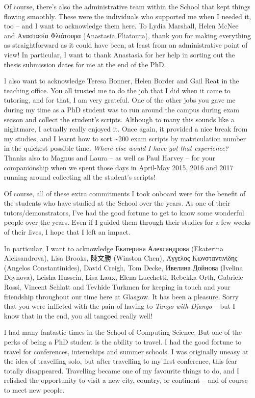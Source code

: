 \begin{preamble}
Of course, there's also the administrative team within the School that kept things flowing smoothly. These were the individuals who supported me when I needed it, too -- and I want to acknowledge them here. To Lydia Marshall, Helen McNee and Αναστασία Φλιάτουρα (Anastasia Fliatoura), thank you for making everything as straightforward as it could have been, at least from an administrative point of view! In particular, I want to thank Anastasia for her help in sorting out the thesis submission dates for me at the end of the PhD.

I also want to acknowledge Teresa Bonner, Helen Border and Gail Reat in the teaching office. You all trusted me to do the job that I did when it came to tutoring, and for that, I am very grateful. One of the other jobs you gave me during my time as a PhD student was to run around the campus during exam season and collect the student's scripts. Although to many this sounds like a nightmare, I actually really enjoyed it. Once again, it provided a nice break from my studies, and I learnt how to sort \textasciitilde 200 exam scripts by matriculation number in the quickest possible time. \emph{Where else would I have got that experience?} Thanks also to Magnus and Laura -- as well as Paul Harvey -- for your companionship when we spent those days in April-May 2015, 2016 and 2017 running around collecting all the student's scripts!

Of course, all of these extra commitments I took onboard were for the benefit of the students who have studied at the School over the years. As one of their tutors/demonstrators, I've had the good fortune to get to know some wonderful people over the years. Even if I guided them through their studies for a few weeks of their lives, I hope that I left an impact.

In particular, I want to acknowledge Екатерина Александрова (Ekaterina Aleksandrova), Lisa Brooks, {\asianfont 陳文勝} (Winston Chen), Άγγελος Κωνσταντινίδης (Angelos Constantinides), David Creigh, Tom Decke, Ивелина Дойнова (Ivelina Doynova), Leisha Hussein, Lisa Laux, Elena Lucchetti, Rebekka Orth, Gabriele Rossi, Vincent Schlatt and Tevhide Turkmen for keeping in touch and your friendship throughout our time here at Glasgow. It has been a pleasure. Sorry that you were inflicted with the pain of having to \emph{Tango with Django} -- but I know that in the end, you all tangoed really well!

I had many fantastic times in the School of Computing Science. But one of the perks of being a PhD student is the ability to travel. I had the good fortune to travel for conferences, internships and summer schools. I was originally uneasy at the idea of travelling solo, but after travelling to my first conference, this fear totally disappeared. Travelling became one of my favourite things to do, and I relished the opportunity to visit a new city, country, or continent -- and of course to meet new people.


\end{preamble}
